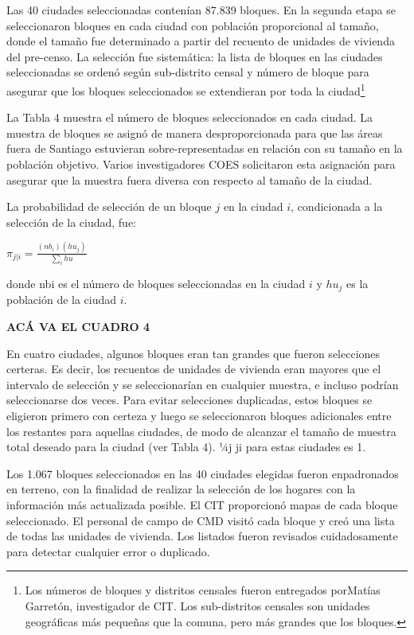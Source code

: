 \documentclass[
]{book}
\begin{document}
Las 40 ciudades seleccionadas contenían 87.839 bloques. En la segunda
etapa se seleccionaron bloques en cada ciudad con población proporcional
al tamaño, donde el tamaño fue determinado a partir del recuento de
unidades de vivienda del pre-censo. La selección fue sistemática: la
lista de bloques en las ciudades seleccionadas se ordenó según
sub-distrito censal y número de bloque para asegurar que los bloques
seleccionados se extendieran por toda la ciudad\footnote{Los números de
  bloques y distritos censales fueron entregados porMatías Garretón,
  investigador de CIT. Los sub-distritos censales son unidades
  geográficas más pequeñas que la comuna, pero más grandes que los
  bloques.}

La Tabla 4 muestra el número de bloques seleccionados en cada ciudad. La
muestra de bloques se asignó de manera desproporcionada para que las
áreas fuera de Santiago estuvieran sobre-representadas en relación con
su tamaño en la población objetivo. Varios investigadores COES
solicitaron esta asignación para asegurar que la muestra fuera diversa
con respecto al tamaño de la ciudad.

La probabilidad de selección de un bloque \(j\) en la ciudad \(i\),
condicionada a la selección de la ciudad, fue:

\(\pi_{j|i}=\frac{(nb_i)(hu_j)}{\sum_i hu}\)

donde nbi es el número de bloques seleccionadas en la ciudad \(i\) y
\(hu_j\) es la población de la ciudad \(i\).

\textbf{ACÁ VA EL CUADRO 4}

En cuatro ciudades, algunos bloques eran tan grandes que fueron
selecciones certeras. Es decir, los recuentos de unidades de vivienda
eran mayores que el intervalo de selección y se seleccionarían en
cualquier muestra, e incluso podrían seleccionarse dos veces. Para
evitar selecciones duplicadas, estos bloques se eligieron primero con
certeza y luego se seleccionaron bloques adicionales entre los restantes
para aquellas ciudades, de modo de alcanzar el tamaño de muestra total
deseado para la ciudad (ver Tabla 4). ¼j ji para estas ciudades es 1.

Los 1.067 bloques seleccionados en las 40 ciudades elegidas fueron
enpadronados en terreno, con la finalidad de realizar la selección de
los hogares con la información más actualizada posible. El CIT
proporcionó mapas de cada bloque seleccionado. El personal de campo de
CMD visitó cada bloque y creó una lista de todas las unidades de
vivienda. Los listados fueron revisados cuidadosamente para detectar
cualquier error o duplicado.
\end{document}
